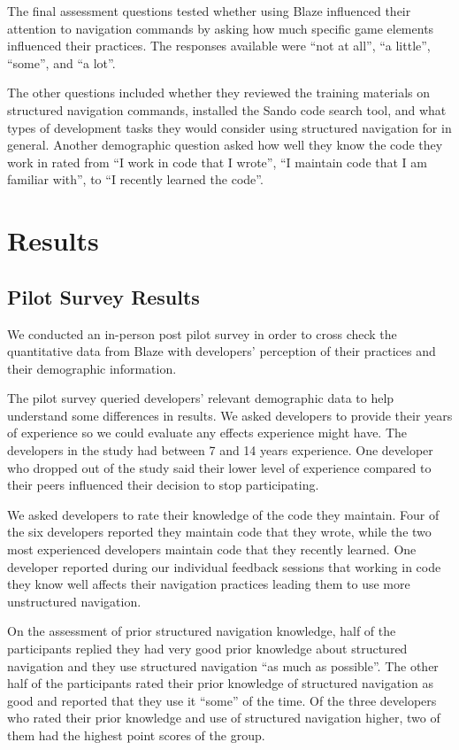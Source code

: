 \documentclass{sig-alternate}
\begin{document}
The final assessment questions tested whether using Blaze influenced their attention to navigation commands by asking how much specific game elements influenced their practices.  The responses available were ``not at all'', ``a little'', ``some'', and ``a lot''.  

The other questions included whether they reviewed the training materials on structured navigation commands, installed the Sando code search tool, and what types of development tasks they would consider using structured navigation for in general.  Another demographic question asked how well they know the code they work in rated from ``I work in code that I wrote'', ``I maintain code that I am familiar with'', to ``I recently learned the code''.

\section{Results}

\subsection{Pilot Survey Results}

We conducted an in-person post pilot survey in order to cross check the quantitative data from Blaze with developers' perception of their practices and their demographic information.

The pilot survey queried developers' relevant demographic data to help understand some differences in results.  We asked developers to provide their years of experience so we could evaluate any effects experience might have.  The developers in the study had between 7 and 14 years experience.  One developer who dropped out of the study said their lower level of experience compared to their peers influenced their decision to stop participating.  

We asked developers to rate their knowledge of the code they maintain.  Four of the six developers reported they maintain code that they wrote, while the two most experienced developers maintain code that they recently learned.  One developer reported during our individual feedback sessions that working in code they know well affects their navigation practices leading them to use more unstructured navigation.

On the assessment of prior structured navigation knowledge, half of the participants replied they had very good prior knowledge about structured navigation and they use structured navigation ``as much as possible''.  The other half of the participants rated their prior knowledge of structured navigation as good and reported that they use it ``some'' of the time. Of the three developers who rated their prior knowledge and use of structured navigation higher, two of them had the highest point scores of the group.
\end{document}
